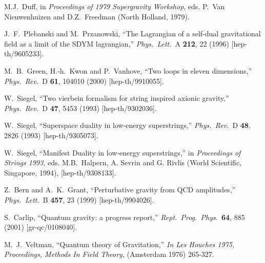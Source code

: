 \documentclass[12pt]{livrev}
\begin{document}
\begin{thebibliography}{99}
M.J.\ Duff, in {\it Proceedings of 1979 Supergravity Workshop},
eds. P.\ Van Nieuwenhuizen and D.Z.\ Freedman (North Holland, 1979).

J.~F.~Plebanski and M.~Przanowski,
``The Lagrangian of a self-dual gravitational field as a limit 
of the  SDYM lagrangian,''
{\it Phys.\ Lett.}\ A {\bf 212}, 22 (1996)
[hep-th/9605233].

M.~B.~Green, H.-h.~Kwon and P.~Vanhove,
``Two loops in eleven dimensions,''
{\it Phys.\ Rev.}\ D {\bf 61}, 104010 (2000)
[hep-th/9910055].

W.~Siegel,
``Two vierbein formalism for string inspired axionic gravity,''
{\it Phys.\ Rev.}\ D {\bf 47}, 5453 (1993)
[hep-th/9302036].

W.~Siegel,
``Superspace duality in low-energy superstrings,''
{\it Phys.\ Rev.}\ D {\bf 48}, 2826 (1993)
[hep-th/9305073].

W.~Siegel, 
``Manifest Duality in low-energy superstrings,''
in {\it Proceedings of Strings 1993}, 
eds. M.B.\ Halpern, A. Sevrin and G. Rivlis
(World Scientific, Singapore, 1994), [hep-th/9308133].

Z.~Bern and A.~K.~Grant,
``Perturbative gravity from {QCD} amplitudes,''
{\it Phys.\ Lett.}\ B {\bf 457}, 23 (1999)
[hep-th/9904026].

S.~Carlip,
``Quantum gravity: a progress report,''
{\it Rept.\ Prog.\ Phys.}\ {\bf 64}, 885 (2001)
[gr-qc/0108040].

M.~J.~Veltman,
``Quantum theory of Gravitation,''
{\it  In Les Houches 1975, Proceedings, Methods In Field Theory}, 
(Amsterdam 1976) 265-327.


\end{thebibliography}
\end{document}
